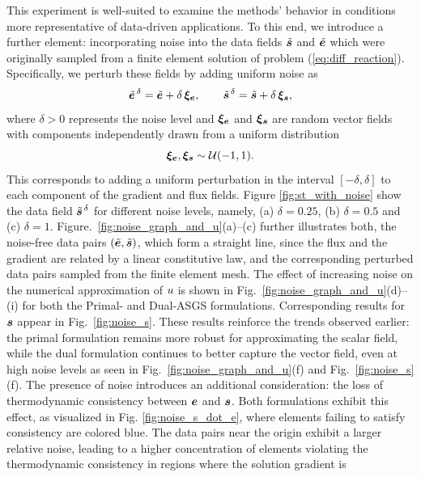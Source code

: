 This experiment is well-suited to examine the methods' behavior in conditions more representative of data-driven applications. To this end, we introduce a further element: incorporating noise into the data fields $\tilde{\bm{s}}$ and $\tilde{\bm{e}}$ which were originally sampled from a finite element solution of problem (\ref{eq:diff_reaction}). Specifically, we perturb these fields by adding uniform noise as
\begin{equation}
	\tilde{\bm{e}}^{\,\delta} = \tilde{\bm{e}} + \delta\,\boldsymbol{\xi}_{\bm{e}},
	\qquad
	\tilde{\bm{s}}^{\,\delta} = \tilde{\bm{s}} + \delta\,\boldsymbol{\xi}_{\bm{s}},
\end{equation}
where $\delta > 0$ represents the noise level and $\boldsymbol{\xi}_{\bm{e}}$ and $\boldsymbol{\xi}_{\bm{s}}$ are random vector fields with components independently drawn from a uniform distribution
\begin{equation}
	\boldsymbol{\xi}_{\bm{e}}, \boldsymbol{\xi}_{\bm{s}} \sim \mathcal{U}(-1,1).
\end{equation}
This corresponds to adding a uniform perturbation in the interval $[-\delta, \delta]$ to each component of the gradient and flux fields. Figure \ref{fig:st_with_noise} show the data field $\tilde{\bm{s}}^{\,\delta}$ for different noise levels, namely, (a) $\delta=0.25$, (b) $\delta=0.5$ and
(c) $\delta=1$. Figure.~\ref{fig:noise_graph_and_u}(a)--(c) further illustrates
both, the noise-free data pairs $(\tilde{\bm{e}},\tilde{\bm{s}})$, which form a straight line, since the flux and the gradient are related by a linear constitutive law, and the corresponding perturbed data pairs sampled from the finite element mesh.
The effect of increasing noise on the numerical approximation of $u$ is shown in Fig.~\ref{fig:noise_graph_and_u}(d)–(i) for both the Primal- and Dual-ASGS formulations. Corresponding results for $\bm{s}$ appear in Fig.~\ref{fig:noise_s}. These results reinforce the trends observed earlier: the primal formulation remains more robust for approximating the scalar field, while the dual formulation continues to better capture the vector field, even at high noise levels as seen in Fig.~\ref{fig:noise_graph_and_u}(f) and Fig.~\ref{fig:noise_s}(f). 
The presence of noise introduces an additional consideration: the loss of thermodynamic consistency between $\bm{e}$ and $\bm{s}$. Both formulations exhibit this effect, as visualized in Fig. \ref{fig:noise_s_dot_e}, where elements failing to satisfy consistency are colored blue. 
The data pairs near the origin exhibit a larger relative noise, leading to a higher concentration
of elements violating the thermodynamic consistency in regions where the solution gradient is 
